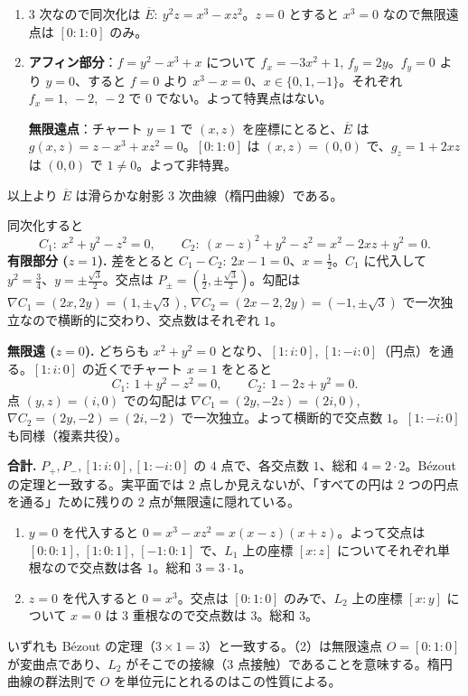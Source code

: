 \begin{enumerate}
  \item $3$ 次なので同次化は $\overline{E}:\ y^2z=x^3-xz^2$。$z=0$ とすると $x^3=0$ なので無限遠点は $[0:1:0]$ のみ。
  \item \textbf{アフィン部分}：$f=y^2-x^3+x$ について $f_x=-3x^2+1$, $f_y=2y$。$f_y=0$ より $y=0$、すると $f=0$ より $x^3-x=0$、$x\in\{0,1,-1\}$。それぞれ $f_x=1,\ -2,\ -2$ で $0$ でない。よって特異点はない。

  \textbf{無限遠点}：チャート $y=1$ で $(x,z)$ を座標にとると、$\overline E$ は $g(x,z)=z-x^3+xz^2=0$。$[0:1:0]$ は $(x,z)=(0,0)$ で、$g_z=1+2xz$ は $(0,0)$ で $1\neq0$。よって非特異。
\end{enumerate}
以上より $\overline E$ は滑らかな射影 $3$ 次曲線（楕円曲線）である。

同次化すると
\[
  C_1:\ x^2+y^2-z^2=0,\qquad C_2:\ (x-z)^2+y^2-z^2=x^2-2xz+y^2=0.
\]
\textbf{有限部分 ($z=1$).} 差をとると $C_1-C_2:\ 2x-1=0$、$x=\tfrac12$。$C_1$ に代入して $y^2=\tfrac34$、$y=\pm\tfrac{\sqrt3}{2}$。交点は $P_\pm=(\tfrac12,\pm\tfrac{\sqrt3}{2})$。勾配は $\nabla C_1=(2x,2y)=(1,\pm\sqrt3)$, $\nabla C_2=(2x-2,2y)=(-1,\pm\sqrt3)$ で一次独立なので横断的に交わり、交点数はそれぞれ $1$。

\textbf{無限遠 ($z=0$).} どちらも $x^2+y^2=0$ となり、$[1:i:0]$, $[1:-i:0]$（円点）を通る。$[1:i:0]$ の近くでチャート $x=1$ をとると
\[
  C_1:\ 1+y^2-z^2=0,\qquad C_2:\ 1-2z+y^2=0.
\]
点 $(y,z)=(i,0)$ での勾配は $\nabla C_1=(2y,-2z)=(2i,0)$, $\nabla C_2=(2y,-2)=(2i,-2)$ で一次独立。よって横断的で交点数 $1$。$[1:-i:0]$ も同様（複素共役）。

\textbf{合計.} $P_+,P_-,[1:i:0],[1:-i:0]$ の $4$ 点で、各交点数 $1$、総和 $4=2\cdot2$。Bézout の定理と一致する。実平面では $2$ 点しか見えないが、「すべての円は $2$ つの円点を通る」ために残りの $2$ 点が無限遠に隠れている。

\begin{enumerate}
  \item $y=0$ を代入すると $0=x^3-xz^2=x(x-z)(x+z)$。よって交点は $[0:0:1]$, $[1:0:1]$, $[-1:0:1]$ で、$L_1$ 上の座標 $[x:z]$ についてそれぞれ単根なので交点数は各 $1$。総和 $3=3\cdot1$。
  \item $z=0$ を代入すると $0=x^3$。交点は $[0:1:0]$ のみで、$L_2$ 上の座標 $[x:y]$ について $x=0$ は $3$ 重根なので交点数は $3$。総和 $3$。
\end{enumerate}
いずれも Bézout の定理（$3\times1=3$）と一致する。（2）は無限遠点 $O=[0:1:0]$ が変曲点であり、$L_2$ がそこでの接線（$3$ 点接触）であることを意味する。楕円曲線の群法則で $O$ を単位元にとれるのはこの性質による。

